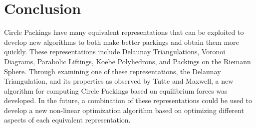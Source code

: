 \documentclass[11pt]{article}
\theoremstyle{definition}
\begin{document}
\section{Conclusion}

	Circle Packings have many equivalent representations that can be exploited to develop new algorithms to both make better packings and obtain them more quickly. 
	These representations include Delaunay Triangulations, Voronoi Diagrams, Parabolic Liftings, Koebe Polyhedrons, and Packings on the Riemann Sphere. 
	Through examining one of these representations, the Delaunay Triangulation, and its properties as observed by Tutte and Maxwell, a new algorithm for computing Circle Packings based on equilibrium forces was developed. 
	In the future, a combination of these representations could be used to develop a new non-linear optimization algorithm based on optimizing different aspects of each equivalent representation.



\end{document}
